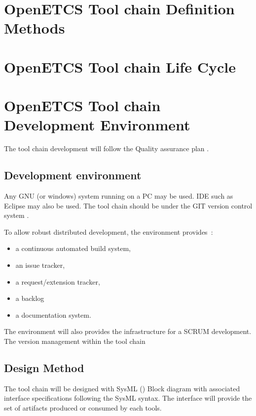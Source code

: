 \documentclass{openetcs_article}
\begin{document}
\section{OpenETCS Tool chain Definition Methods}
\label{sec:toolchaindef}



\section{OpenETCS Tool chain Life Cycle}
\label{sec:lifecycle}


\section{OpenETCS Tool chain Development Environment}
\label{sec:env}
The tool chain development will follow the Quality assurance plan \cite{D1.3.1}.
\subsection{Development environment}
Any GNU (or windows) system running on a PC may be used. \gls{IDE}  such as Eclipse may
also be used. 
The tool chain should be under the GIT  version control system
\cite{Chacon:2009}.


To allow robust distributed development, the  environment provides~:
\begin{itemize}
\item  a continuous automated build system,
\item an issue tracker,
\item a request/extension tracker,
\item a backlog
\item a  documentation system.

\end{itemize}
The environment will also provides the infrastructure for a SCRUM development.
The version management within the tool chain 

\subsection{Design Method}
The tool chain will be designed with SysML (\cite{SysML}) Block
diagram with associated interface specifications following the SysML syntax.
The interface will provide the set of artifacts produced or consumed by each tools.
\end{document}
